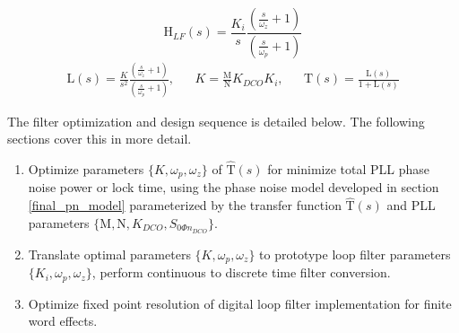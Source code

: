 	\begin{equation}\label{eq:loop_filter_def}
	\mathrm{H}_{LF}(s) = \frac{K_i}{s}\frac{(\frac{s}{\omega_z}+1)}{(\frac{s}{\omega_p}+1)}
	\end{equation}
	\begin{align}\label{eq:pll_tf_def}
	\mathrm{L}(s) = \frac{K}{s^2}\frac{(\frac{s}{\omega_z}+1)}{(\frac{s}{\omega_p}+1)},
	&&K=\frac{\mathrm{M}}{\mathrm{N}}K_{DCO}K_i,
	&&\mathrm{\hat{T}}(s) = \frac{\mathrm{L}(s)}{1+\mathrm{L}(s)}
	\end{align}

The filter optimization and design sequence is detailed below. The following sections cover this in more detail. 

\begin{enumerate}[itemsep=0pt,label=\protect\mycirc{\arabic*}]
	\setlength\itemsep{-0.8em}
	\item Optimize parameters $\{K, \omega_p, \omega_z\}$ of $\mathrm{\hat{T}}(s)$ for minimize total PLL phase noise power or lock time, using the phase noise model developed in section \ref{final_pn_model} parameterized by the transfer function $\mathrm{\hat{T}}(s)$ and PLL parameters $\{\mathrm{M},\mathrm{N},K_{DCO},S_{0\Phi n_{DCO}}\}$.
	\item Translate optimal parameters $\{K, \omega_p, \omega_z\}$ to prototype loop filter parameters $\{K_i, \omega_p, \omega_z\}$, perform continuous to discrete time filter conversion.
	\item Optimize fixed point resolution of digital loop filter implementation for finite word effects.
\end{enumerate}

